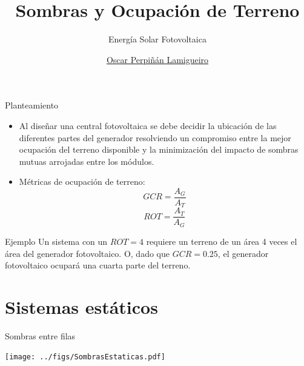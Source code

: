 \documentclass[aspectratio=169, usenames,svgnames,dvipsnames]{beamer}
\author{\href{https://oscarperpinan.github.io}{Oscar Perpiñán Lamigueiro}}
\date{}
\title{Sombras y Ocupación de Terreno}
\subtitle{Energía Solar Fotovoltaica}
\institute[UPM]{Universidad Politécnica de Madrid}
\begin{document}
\maketitle

\begin{frame}[label={sec:org412f51b}]{Planteamiento}
\begin{itemize}
\item Al diseñar una central fotovoltaica se debe decidir la ubicación de las diferentes partes del generador resolviendo un \alert{compromiso} entre la mejor \alert{ocupación del terreno} disponible y la minimización del \alert{impacto de sombras mutuas} arrojadas entre los módulos.
\item Métricas de ocupación de terreno:
\[GCR = \frac{A_G}{A_T}\]
\[ROT = \frac{A_T}{A_G}\]
\end{itemize}
\begin{block}{Ejemplo}
Un sistema con un \(ROT = 4\) requiere un terreno de un área 4 veces el área del generador fotovoltaico. O, dado que \(GCR = 0.25\), el generador fotovoltaico ocupará una cuarta parte del terreno.
\end{block}
\end{frame}

\section{Sistemas estáticos}
\label{sec:org02b5893}

\begin{frame}[label={sec:org86bfbde}]{Sombras entre filas}
\begin{center}
\texttt{[image: ../figs/SombrasEstaticas.pdf]}
\end{center}
\end{frame}
\end{document}
